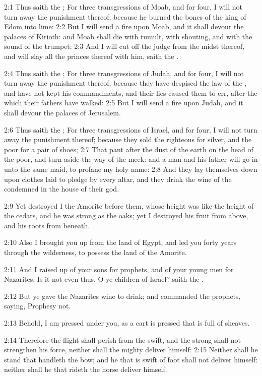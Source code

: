 2:1 Thus saith the \LORD; For three transgressions of Moab, and for
four, I will not turn away the punishment thereof; because he burned
the bones of the king of Edom into lime: 2:2 But I will send a fire
upon Moab, and it shall devour the palaces of Kirioth: and Moab shall
die with tumult, with shouting, and with the sound of the trumpet: 2:3
And I will cut off the judge from the midst thereof, and will slay all
the princes thereof with him, saith the \LORD.

2:4 Thus saith the \LORD; For three transgressions of Judah, and for
four, I will not turn away the punishment thereof; because they have
despised the law of the \LORD, and have not kept his commandments, and
their lies caused them to err, after the which their fathers have
walked: 2:5 But I will send a fire upon Judah, and it shall devour the
palaces of Jerusalem.

2:6 Thus saith the \LORD; For three transgressions of Israel, and for
four, I will not turn away the punishment thereof; because they sold
the righteous for silver, and the poor for a pair of shoes; 2:7 That
pant after the dust of the earth on the head of the poor, and turn
aside the way of the meek: and a man and his father will go in unto
the same maid, to profane my holy name: 2:8 And they lay themselves
down upon clothes laid to pledge by every altar, and they drink the
wine of the condemned in the house of their god.

2:9 Yet destroyed I the Amorite before them, whose height was like the
height of the cedars, and he was strong as the oaks; yet I destroyed
his fruit from above, and his roots from beneath.

2:10 Also I brought you up from the land of Egypt, and led you forty
years through the wilderness, to possess the land of the Amorite.

2:11 And I raised up of your sons for prophets, and of your young men
for Nazarites. Is it not even thus, O ye children of Israel? saith the
\LORD.

2:12 But ye gave the Nazarites wine to drink; and commanded the
prophets, saying, Prophesy not.

2:13 Behold, I am pressed under you, as a cart is pressed that is full
of sheaves.

2:14 Therefore the flight shall perish from the swift, and the strong
shall not strengthen his force, neither shall the mighty deliver
himself: 2:15 Neither shall he stand that handleth the bow; and he
that is swift of foot shall not deliver himself: neither shall he that
rideth the horse deliver himself.

